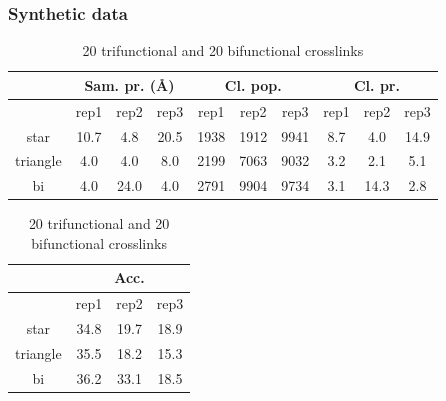 \documentclass[a4paper,8pt]{beamer}
\begin{document}
\begin{frame}
\frametitle{Synthetic data}
\begin{table}[htbp]
  \centering
  \caption{20 trifunctional and 20 bifunctional crosslinks}
  \begin{tabular}{|c|ccc|ccc|ccc|}
      \hline
      & \multicolumn{3}{c|}{Sam. pr. ({\AA})} 
      & \multicolumn{3}{c|}{Cl. pop.} 
      & \multicolumn{3}{c|}{Cl. pr.} \\ \hline
      & rep1 & rep2 & rep3 
      & rep1 & rep2 & rep3 
      & rep1 & rep2 & rep3 \\ \hline
      star 
        & 10.7 & 4.8 & 20.5 
        & 1938  & 1912 & 9941
        & 8.7 & 4.0 & 14.9\\ \hline
      triangle 
        & 4.0 & 4.0 & 8.0 
        & 2199 & 7063 & 9032 
        &  3.2 & 2.1 & 5.1 \\ \hline
      bi 
        & 4.0 & 24.0 & 4.0  
        & 2791 & 9904 & 9734 
        & 3.1 & 14.3 & 2.8  \\ \hline
  \end{tabular}
\end{table}
%
\begin{table}[htbp]
  \centering
  \caption{20 trifunctional and 20 bifunctional crosslinks}
  \begin{tabular}{|c|ccc|}
      \hline 
      & \multicolumn{3}{c|}{Acc.} \\ \hline
      & rep1 & rep2 & rep3 \\ \hline
      star 
        &  34.8 & 19.7 & 18.9 \\ \hline
      triangle 
        & 35.5 & 18.2 & 15.3 \\ \hline
      bi 
        & 36.2 & 33.1 & 18.5 \\ \hline
  \end{tabular}
\end{table}
\end{frame}
\end{document}
